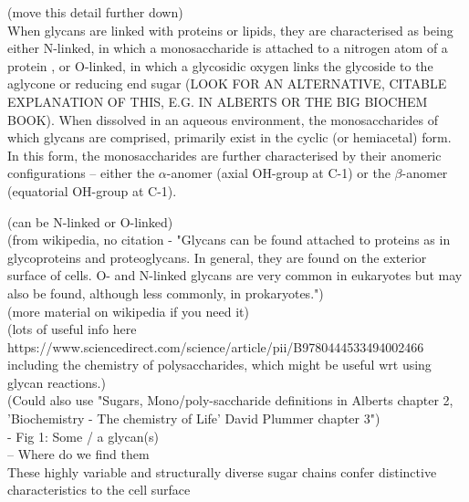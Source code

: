 \documentclass[12pt,a4paper]{article}
\begin{document}
(move this detail further down)\\
When glycans are linked with proteins or lipids, they are characterised as being either N-linked, in which a monosaccharide is attached to a nitrogen atom of a protein \citep{taylor2011introduction}, or O-linked, in which a glycosidic oxygen links the glycoside to the aglycone or reducing end sugar (LOOK FOR AN ALTERNATIVE, CITABLE EXPLANATION OF THIS, E.G. IN ALBERTS OR THE BIG BIOCHEM BOOK).
When dissolved in an aqueous environment, the monosaccharides of which glycans are comprised, primarily exist in the cyclic (or hemiacetal) form. In this form, the monosaccharides are further characterised by their anomeric configurations -- either the $\alpha$-anomer (axial OH-group at C-1) or the $\beta$-anomer (equatorial OH-group at C-1).


(can be N-linked or O-linked)\\
(from wikipedia, no citation - "Glycans can be found attached to proteins as in glycoproteins and proteoglycans. In general, they are found on the exterior surface of cells. O- and N-linked glycans are very common in eukaryotes but may also be found, although less commonly, in prokaryotes.")\\

(more material on wikipedia if you need it)\\
(lots of useful info here https://www.sciencedirect.com/science/article/pii/B9780444533494002466 including the chemistry of polysaccharides, which might be useful wrt using glycan reactions.)\\


(Could also use "Sugars, Mono/poly-saccharide definitions in Alberts chapter 2, 'Biochemistry - The chemistry of Life' David Plummer chapter 3")\\

- Fig 1: Some / a glycan(s)\\
















-- Where do we find them\\

These highly variable and structurally diverse sugar chains confer distinctive characteristics to the cell surface \citep{10.1371/journal.pcbi.1002813} \\
\end{document}
